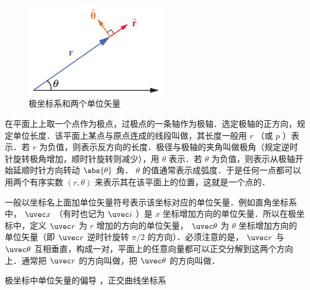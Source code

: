 
\begin{figure}[ht]
\centering
\includegraphics[width=6cm]{./figures/Polar.pdf}
\caption{极坐标系和两个单位矢量}
\end{figure}
在平面上上取一个点作为极点，过极点的一条轴作为极轴．选定极轴的正方向，规定单位长度．该平面上某点与原点连成的线段叫做，其长度一般用 $r$ （或 $p$ ）表示．若 $r$ 为负值，则表示反方向的长度．极径与极轴的夹角叫做极角（规定逆时针旋转极角增加，顺时针旋转则减少），用 $\theta $ 表示．若 $\theta $ 为负值，则表示从极轴开始延顺时针方向转动 $\abs{\theta}$ 角． $\theta $ 的值通常表示成弧度．于是任何一点都可以用两个有序实数 $(r,\theta)$ 来表示其在该平面上的位置，这就是一个点的．

一般以坐标名上面加单位矢量符号表示该坐标对应的单位矢量．例如直角坐标系中， $\uvec x$ （有时也记为 $\uvec i$ ）是 $x$ 坐标增加方向的单位矢量．所以在极坐标中，定义 $\uvec r$ 为 $r$ 增加的方向的单位矢量， $\uvec \theta $ 为 $\theta $ 坐标增加方向的单位矢量（即 $\uvec r$ 逆时针旋转 $\pi/2$ 的方向）．必须注意的是， $\uvec r$ 与 $\uvec \theta$ 互相垂直，构成一对，平面上的任意向量都可以正交分解到这两个方向上．通常把 $\uvec r$ 的方向叫做，把 $\uvec \theta $ 的方向叫做．

\begin{mdframed} 极坐标中单位矢量的偏导%
，正交曲线坐标系%
\end{mdframed}





































